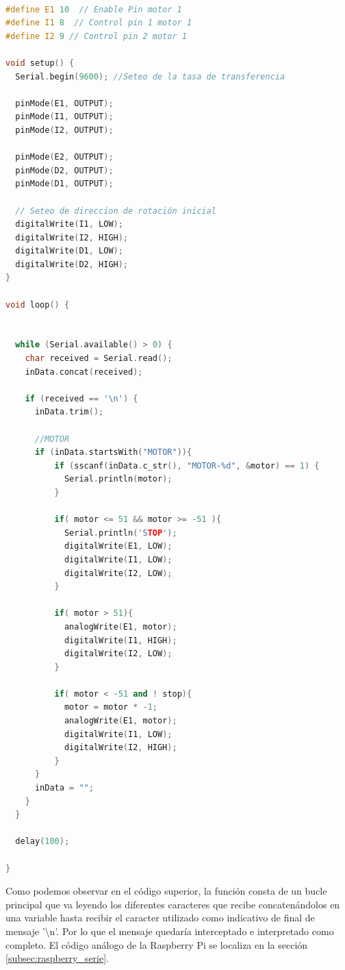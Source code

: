 \begin{lstlisting}[language=C++]

#define E1 10  // Enable Pin motor 1
#define I1 8  // Control pin 1 motor 1
#define I2 9 // Control pin 2 motor 1

void setup() {
  Serial.begin(9600); //Seteo de la tasa de transferencia

  pinMode(E1, OUTPUT);
  pinMode(I1, OUTPUT);
  pinMode(I2, OUTPUT);

  pinMode(E2, OUTPUT);
  pinMode(D2, OUTPUT);
  pinMode(D1, OUTPUT);

  // Seteo de direccion de rotación inicial
  digitalWrite(I1, LOW);
  digitalWrite(I2, HIGH);
  digitalWrite(D1, LOW);
  digitalWrite(D2, HIGH);
}

void loop() {


  while (Serial.available() > 0) {
    char received = Serial.read();
    inData.concat(received);

    if (received == '\n') {
      inData.trim();

      //MOTOR
      if (inData.startsWith("MOTOR")){
          if (sscanf(inData.c_str(), "MOTOR-%d", &motor) == 1) {
            Serial.println(motor);
          }

          if( motor <= 51 && motor >= -51 ){
            Serial.println('STOP');
            digitalWrite(E1, LOW);
            digitalWrite(I1, LOW);
            digitalWrite(I2, LOW);
          }

          if( motor > 51){
            analogWrite(E1, motor);
            digitalWrite(I1, HIGH);
            digitalWrite(I2, LOW);
          }

          if( motor < -51 and ! stop){
            motor = motor * -1;
            analogWrite(E1, motor);
            digitalWrite(I1, LOW);
            digitalWrite(I2, HIGH);
          }
      }
      inData = "";
    }
  }
 
  delay(100);

}
\end{lstlisting}


Como podemos observar en el código superior, la función consta de un bucle principal que va leyendo los diferentes caracteres que recibe concatenándolos en una variable hasta recibir 
el caracter utilizado como indicativo de final de mensaje '\textbackslash n'. Por lo que el mensaje quedaría interceptado e interpretado como completo. El código 
análogo de la Raspberry Pi se localiza en la sección \ref{subsec:raspberry_serie}.\\

